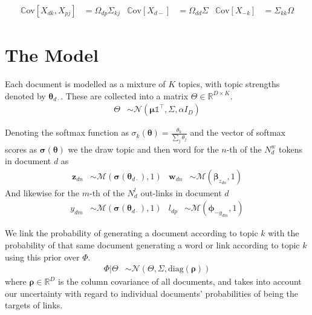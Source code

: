 \documentclass{sciposter}
\newcommand \cov[1] {
    \mathbb{C}\text{ov}[ #1 ]
}
\newcommand \T { ^\top }
\newcommand \vv[1] { \bm #1 }
\newcommand \diag[1] { \text{diag} \left( {#1} \right) }
\newcommand \wdn[0]  { { \vv{w}_{dn} } }
\newcommand \zdn[0]  { { \vv{z}_{dn} } }
\newcommand \mnor[3]  { \mathcal{N} \left(#1, #2, #3\right) }
\newcommand \muln[2]  { \mathcal{M} \left( {#1},{#2} \right) }
\newcommand \beta[1]  { \mathcal{B}eta \left( {#1}, {#2} \right) }
\newcommand \VReal[1] { { \mathbb{R}^{#1} } }
\newcommand \MReal[2] { { \mathbb{R}^{#1 \times #2} } }
\newcommand \one  {{  \mathds{1} }}
\newcommand \thdo { { \vv{\theta}_{d\cdot} } }
\begin{document}
\begin{multicols}{3}
\begin{align*}
\cov{X_{dk}, X_{pj}} & = \Omega_{dp} \Sigma_{kj} &
\cov{X_{d-}} & = \Omega_{dd} \Sigma &
\cov{X_{-k}} & = \Sigma_{kk} \Omega 
\end{align*}


\newcommand{\imsize}{0.45\columnwidth}
%


\section{The Model}




Each document is modelled as a mixture of $K$ topics, with topic strengths denoted by $\thdo$. These are collected into a matrix $\Theta \in \MReal{D}{K}$. 
\begin{align*}
\Theta &\sim \mnor{\vv{\mu}\one\T}{\Sigma}{\alpha I_D}
\end{align*}

Denoting the softmax function as $\sigma_k(\vv{\theta}) = \frac{\theta_k}{\sum_j \theta_j}$ and the vector of softmax scores as $\vv{\sigma}(\vv{\theta})$ we 
the draw topic and then word for the $n$-th of the $N^w_d$ tokens in document $d$ as
\begin{align*}
\zdn & \sim \muln{\vv{\sigma}(\thdo)}{1} &
\wdn & \sim \muln{\vv{\beta}_{z_{dn}}}{1}
\end{align*}
And likewise for the $m$-th of the $N^l_d$ out-links in document $d$
\begin{align*}
y_{dm} & \sim \muln{\vv{\sigma}(\thdo)}{1} &
l_{dp} & \sim \muln{\vv{\phi}_{- y_{dm}}}{1}
\end{align*}

We link the probability of generating a document according to topic $k$ with the probability of that same document generating a word or link according to topic $k$ using this prior over $\Phi$.
\begin{align*}
\Phi|\Theta & \sim \mnor{\Theta}{\Sigma}{\diag{\vv{\rho}}}
\end{align*}
where $\vv{\rho} \in \VReal{D}$ is the column covariance of all documents, and takes into account our uncertainty with regard to individual documents' probabilities of being the targets of links.



\end{multicols}
\end{document}
